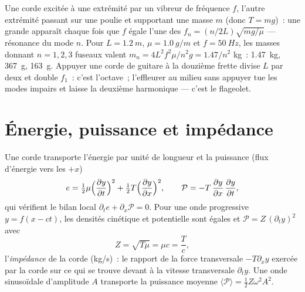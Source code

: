 \begin{example}\label{ex:b2:waves-on-strings:melde}
Une corde excitée à une extrémité par un vibreur de fréquence $f$, l'autre extrémité
passant sur une poulie et supportant une masse $m$ (donc $T = mg$)~: une grande
 apparaît chaque fois que $f$ égale l'une des $f_n = (n/2L)
\sqrt{mg/\mu}$ --- résonance du mode $n$. Pour $L = \qty{1.2}{m}$, $\mu =
\qty{1.0}{g/m}$ et $f = \qty{50}{Hz}$, les masses donnant $n = 1, 2, 3$ fuseaux
valent $m_n = 4L^2f^2\mu/n^2g = 1.47/n^2$ kg~: \qty{1.47}{kg}, \qty{367}{g}, \qty{163}{g}.
Appuyer une corde de guitare à la douzième frette divise $L$ par deux et double
$f_1$~: c'est l'octave~; l'effleurer au milieu sans appuyer
tue les modes impairs et laisse la deuxième harmonique --- c'est le flageolet.
\end{example}

\section{Énergie, puissance et impédance}

\begin{proposition}\label{prop:b2:waves-on-strings:energy}
Une corde transporte l'énergie par unité de longueur et la puissance (flux
d'énergie vers les $+x$)
\[
e = \tfrac12\mu\Bigl(\frac{\partial y}{\partial t}\Bigr)^2 + \tfrac12T\Bigl(\frac{\partial y}{\partial x}\Bigr)^2 ,
\qquad
\mathcal P = -T\,\frac{\partial y}{\partial x}\,\frac{\partial y}{\partial t} ,
\]
qui vérifient le bilan local $\partial_te + \partial_x\mathcal P = 0$. Pour une
onde progressive $y = f(x - ct)$, les densités cinétique et potentielle sont
égales et $\mathcal P = Z\,(\partial_ty)^2$ avec
\[
Z = \sqrt{T\mu} = \mu c = \frac Tc ,
\]
l'\emph{impédance} de la corde (\unit{kg/s})~: le rapport de la
force transversale $-T\partial_xy$ exercée par la corde sur ce qui se trouve devant
à la vitesse transversale $\partial_ty$. Une onde sinusoïdale d'amplitude $A$
transporte la puissance moyenne $\langle\mathcal P\rangle = \tfrac12Z\omega^2A^2$.
\end{proposition}

